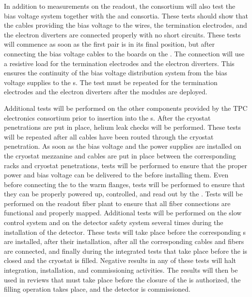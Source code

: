 In addition to measurements
on the 
readout, %
the  consortium will also
test the bias voltage system together with the 
and  consortia. These tests should show that
the cables providing the bias voltage to the  wires, the
 termination electrodes, and the electron diverters are connected
properly with no short circuits. %
These tests will commence %
as soon as %
the first  pair 
is in its final position, but after connecting the bias voltage cables to the 
 boards on the . %
The connection will use a resistive load for the 
 termination electrodes and the electron diverters. This ensures
the continuity of the bias voltage distribution system from the bias voltage
supplies to the s. The test must be repeated for the 
termination electrodes and the electron diverters after 
the  modules are deployed.

Additional tests will be performed on the other components provided by the TPC electronics   consortium prior to insertion into the s. 
After the cryostat penetrations are put in place, helium leak checks
will be performed. 
These tests will be repeated 
after all cables have been routed through the cryostat penetration.
As soon as the bias voltage and the power supplies are installed on the cryostat mezzanine and cables are put in place between the corresponding racks and
cryostat penetrations, tests will be performed to ensure that the proper 
power and bias voltage can be delivered to the  before installing them. 
Even before connecting the  to the warm flanges,
tests will be performed to ensure that they can be properly powered up, controlled, and read out by the  .
Tests will be performed on the readout fiber plant to ensure that all fiber connections are functional and properly mapped. 
Additional tests will be performed on the slow control
system and on the detector safety system several times during the
installation of the detector. These tests will take place before the
corresponding s are installed, after their installation, after
all the corresponding cables and fibers are connected, and finally
during the integrated tests that take place before
the  is closed and the cryostat is filled. Negative results in any
of these tests will halt integration, installation, and
commissioning activities. The results will then be used in reviews that must
take place before the closure of the  is authorized, the  filling operation takes place, %
and the detector is
commissioned. %

